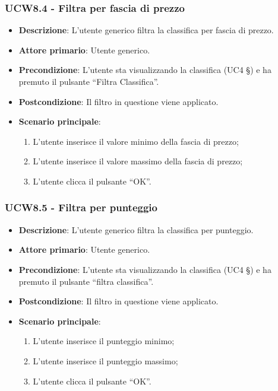 \subsubsection{UCW8.4 - Filtra per fascia di prezzo}
\begin{itemize}
	\item \textbf{Descrizione}: L'utente generico filtra la classifica per fascia di prezzo.
    \item \textbf{Attore primario}: Utente generico.
    \item \textbf{Precondizione}: L’utente sta visualizzando la classifica (UC4 §) e ha premuto il pulsante “Filtra Classifica”.
    \item \textbf{Postcondizione}: Il filtro in questione viene applicato.
    \item \textbf{Scenario principale}: 
    \begin{enumerate}
        \item L’utente inserisce il valore minimo della fascia di prezzo;
        \item L’utente inserisce il valore massimo della fascia di prezzo;
        \item L’utente clicca il pulsante “OK”.
    \end{enumerate}
\end{itemize}

\subsubsection{UCW8.5 - Filtra per punteggio}
\begin{itemize}
	\item \textbf{Descrizione}: L'utente generico filtra la classifica per punteggio.
    \item \textbf{Attore primario}: Utente generico.
    \item \textbf{Precondizione}: L’utente sta visualizzando la classifica (UC4 §) e ha premuto il pulsante “filtra classifica”.
    \item \textbf{Postcondizione}: Il filtro in questione viene applicato.
    \item \textbf{Scenario principale}: 
    \begin{enumerate}
        \item L’utente inserisce il punteggio minimo;
        \item L’utente inserisce il punteggio massimo;
        \item L’utente clicca il pulsante “OK”.
    \end{enumerate}
\end{itemize}


